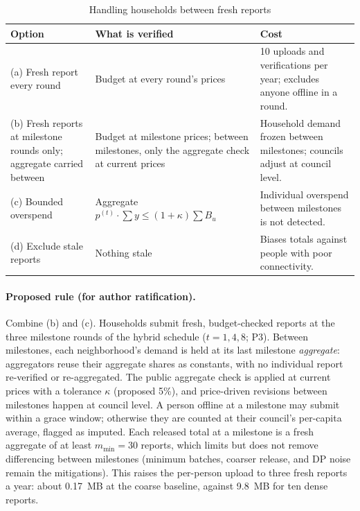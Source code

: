 \documentclass[10pt,twoside,openany]{book}
\theoremstyle{dpepstyle}
\begin{document}
\begin{table}[htbp]
\centering
\caption{Handling households between fresh reports}
\label{tab:carry-options}
\scriptsize
\begin{tabularx}{\textwidth}{L{1.30in} L{1.30in} Y}
\toprule
\textbf{Option} & \textbf{What is verified} & \textbf{Cost} \\
\midrule
(a) Fresh report every round & Budget at every round's prices & 10 uploads and verifications per year; excludes anyone offline in a round. \\
(b) Fresh reports at milestone rounds only; aggregate carried between & Budget at milestone prices; between milestones, only the aggregate check at current prices & Household demand frozen between milestones; councils adjust at council level. \\
(c) Bounded overspend & Aggregate $p^{(t)}\cdot\sum y \le (1+\kappa)\sum B_u$ & Individual overspend between milestones is not detected. \\
(d) Exclude stale reports & Nothing stale & Biases totals against people with poor connectivity. \\
\bottomrule
\end{tabularx}
\end{table}

\paragraph{Proposed rule (for author ratification).}
Combine (b) and (c). Households submit fresh, budget-checked reports at the three milestone rounds of the hybrid schedule ($t=1,4,8$; P3). Between milestones, each neighborhood's demand is held at its last milestone \emph{aggregate}: aggregators reuse their aggregate shares as constants, with no individual report re-verified or re-aggregated. The public aggregate check is applied at current prices with a tolerance $\kappa$ (proposed 5\%), and price-driven revisions between milestones happen at council level. A person offline at a milestone may submit within a grace window; otherwise they are counted at their council's per-capita average, flagged as imputed. Each released total at a milestone is a fresh aggregate of at least $m_{\min}=30$ reports, which limits but does not remove differencing between milestones (minimum batches, coarser release, and DP noise remain the mitigations). This raises the per-person upload to three fresh reports a year: about 0.17~MB at the coarse baseline, against 9.8~MB for ten dense reports.
\end{document}
